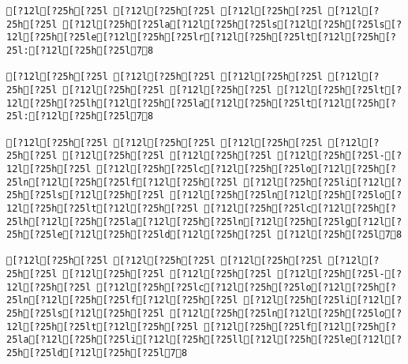 \documentclass{scrartcl}
\begin{document}
\begin{Verbatim}
[?12l[?25h[?25l [?12l[?25h[?25l [?12l[?25h[?25l [?12l[?25h[?25l [?12l[?25h[?25la[?12l[?25h[?25ls[?12l[?25h[?25ls[?12l[?25h[?25le[?12l[?25h[?25lr[?12l[?25h[?25lt[?12l[?25h[?25l:[?12l[?25h[?25l78

[?12l[?25h[?25l [?12l[?25h[?25l [?12l[?25h[?25l [?12l[?25h[?25l [?12l[?25h[?25l [?12l[?25h[?25l [?12l[?25h[?25lt[?12l[?25h[?25lh[?12l[?25h[?25la[?12l[?25h[?25lt[?12l[?25h[?25l:[?12l[?25h[?25l78

[?12l[?25h[?25l [?12l[?25h[?25l [?12l[?25h[?25l [?12l[?25h[?25l [?12l[?25h[?25l [?12l[?25h[?25l [?12l[?25h[?25l-[?12l[?25h[?25l [?12l[?25h[?25lc[?12l[?25h[?25lo[?12l[?25h[?25ln[?12l[?25h[?25lf[?12l[?25h[?25l [?12l[?25h[?25li[?12l[?25h[?25ls[?12l[?25h[?25l [?12l[?25h[?25ln[?12l[?25h[?25lo[?12l[?25h[?25lt[?12l[?25h[?25l [?12l[?25h[?25lc[?12l[?25h[?25lh[?12l[?25h[?25la[?12l[?25h[?25ln[?12l[?25h[?25lg[?12l[?25h[?25le[?12l[?25h[?25ld[?12l[?25h[?25l [?12l[?25h[?25l78

[?12l[?25h[?25l [?12l[?25h[?25l [?12l[?25h[?25l [?12l[?25h[?25l [?12l[?25h[?25l [?12l[?25h[?25l [?12l[?25h[?25l-[?12l[?25h[?25l [?12l[?25h[?25lc[?12l[?25h[?25lo[?12l[?25h[?25ln[?12l[?25h[?25lf[?12l[?25h[?25l [?12l[?25h[?25li[?12l[?25h[?25ls[?12l[?25h[?25l [?12l[?25h[?25ln[?12l[?25h[?25lo[?12l[?25h[?25lt[?12l[?25h[?25l [?12l[?25h[?25lf[?12l[?25h[?25la[?12l[?25h[?25li[?12l[?25h[?25ll[?12l[?25h[?25le[?12l[?25h[?25ld[?12l[?25h[?25l78


\end{Verbatim}
\end{document}
